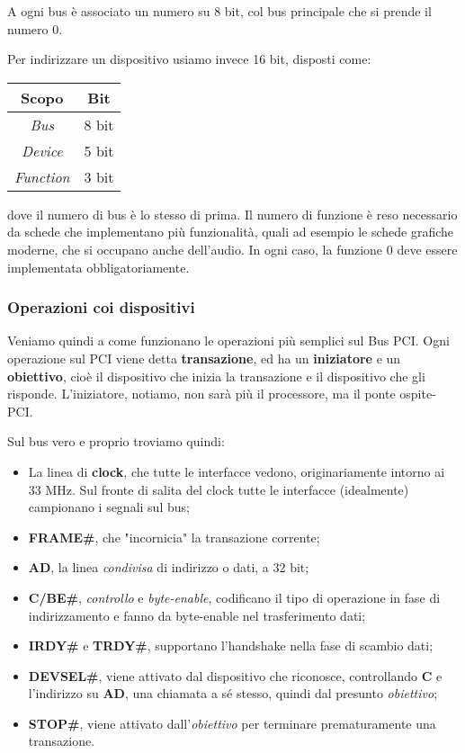 \documentclass[a4paper,11pt]{article}
\begin{document}
A ogni bus è associato un numero su 8 bit, col bus principale che si prende il numero 0.

Per indirizzare un dispositivo usiamo invece 16 bit, disposti come:
\begin{table}[H]
	\center 
	\begin{tabular} { c | c }
		\bfseries Scopo & \bfseries Bit \\
		\hline 
		\textit{Bus} & 8 bit \\
		\textit{Device} & 5 bit \\
		\textit{Function} & 3 bit
	\end{tabular}
\end{table}
dove il numero di bus è lo stesso di prima.
Il numero di funzione è reso necessario da schede che implementano più funzionalità, quali ad esempio le schede grafiche moderne, che si occupano anche dell'audio.
In ogni caso, la funzione 0 deve essere implementata obbligatoriamente.

\subsubsection{Operazioni coi dispositivi}
Veniamo quindi a come funzionano le operazioni più semplici sul Bus PCI.
Ogni operazione sul PCI viene detta \textbf{transazione}, ed ha un \textbf{iniziatore} e un \textbf{obiettivo}, cioè il dispositivo che inizia la transazione e il dispositivo che gli risponde.
L'iniziatore, notiamo, non sarà più il processore, ma il ponte ospite-PCI.

Sul bus vero e proprio troviamo quindi:
\begin{itemize}
	\item La linea di \textbf{clock}, che tutte le interfacce vedono, originariamente intorno ai 33 MHz.
		Sul fronte di salita del clock tutte le interfacce (idealmente) campionano i segnali sul bus;
	\item \textbf{FRAME\#}, che "incornicia" la transazione corrente;
	\item \textbf{AD}, la linea \textit{condivisa} di indirizzo o dati, a 32 bit;
	\item \textbf{C/BE\#}, \textit{controllo} e \textit{byte-enable}, codificano il tipo di operazione in fase di indirizzamento e fanno da byte-enable nel trasferimento dati;
	\item \textbf{IRDY\#} e \textbf{TRDY\#}, supportano l'handshake nella fase di scambio dati;
	\item \textbf{DEVSEL\#}, viene attivato dal dispositivo che riconosce, controllando \textbf{C} e l'indirizzo su \textbf{AD}, una chiamata a sé stesso, quindi dal presunto \textit{obiettivo}; 
	\item \textbf{STOP\#}, viene attivato dall'\textit{obiettivo} per terminare prematuramente una transazione.
\end{itemize}
\end{document}
